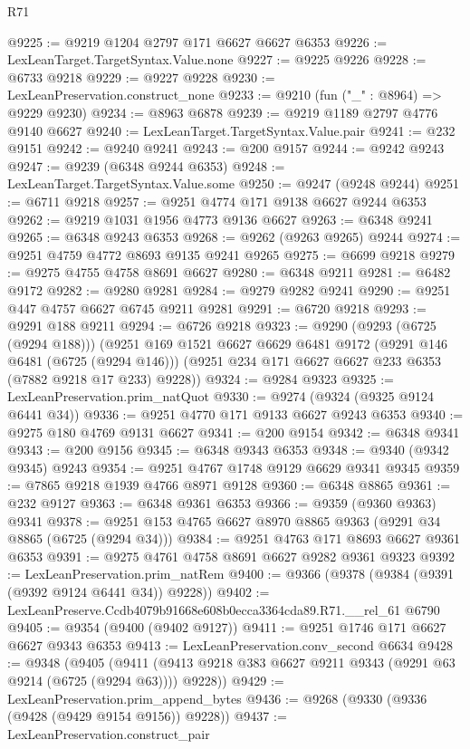 \begin{lexlean}{R71}
\begin{coremodule}
@9225 := @9219 @1204 @2797 @171 @6627 @6627 @6353
@9226 := LexLeanTarget.TargetSyntax.Value.none
@9227 := @9225 @9226
@9228 := @6733 @9218
@9229 := @9227 @9228
@9230 := LexLeanPreservation.construct_none
@9233 := @9210 (fun ("_" : @8964) => @9229 @9230)
@9234 := @8963 @6878
@9239 := @9219 @1189 @2797 @4776 @9140 @6627
@9240 := LexLeanTarget.TargetSyntax.Value.pair
@9241 := @232 @9151
@9242 := @9240 @9241
@9243 := @200 @9157
@9244 := @9242 @9243
@9247 := @9239 (@6348 @9244 @6353)
@9248 := LexLeanTarget.TargetSyntax.Value.some
@9250 := @9247 (@9248 @9244)
@9251 := @6711 @9218
@9257 := @9251 @4774 @171 @9138 @6627 @9244 @6353
@9262 := @9219 @1031 @1956 @4773 @9136 @6627
@9263 := @6348 @9241
@9265 := @6348 @9243 @6353
@9268 := @9262 (@9263 @9265) @9244
@9274 := @9251 @4759 @4772 @8693 @9135 @9241 @9265
@9275 := @6699 @9218
@9279 := @9275 @4755 @4758 @8691 @6627
@9280 := @6348 @9211
@9281 := @6482 @9172
@9282 := @9280 @9281
@9284 := @9279 @9282 @9241
@9290 := @9251 @447 @4757 @6627 @6745 @9211 @9281
@9291 := @6720 @9218
@9293 := @9291 @188 @9211
@9294 := @6726 @9218
@9323 := @9290
    (@9293 (@6725 (@9294 @188)))
    (@9251
      @169
      @1521
      @6627
      @6629
      @6481
      @9172
      (@9291 @146 @6481 (@6725 (@9294 @146)))
      (@9251 @234 @171 @6627 @6627 @233 @6353 (@7882 @9218 @17 @233) @9228))
@9324 := @9284 @9323
@9325 := LexLeanPreservation.prim_natQuot
@9330 := @9274 (@9324 (@9325 @9124 @6441 @34))
@9336 := @9251 @4770 @171 @9133 @6627 @9243 @6353
@9340 := @9275 @180 @4769 @9131 @6627
@9341 := @200 @9154
@9342 := @6348 @9341
@9343 := @200 @9156
@9345 := @6348 @9343 @6353
@9348 := @9340 (@9342 @9345) @9243
@9354 := @9251 @4767 @1748 @9129 @6629 @9341 @9345
@9359 := @7865 @9218 @1939 @4766 @8971 @9128
@9360 := @6348 @8865
@9361 := @232 @9127
@9363 := @6348 @9361 @6353
@9366 := @9359 (@9360 @9363) @9341
@9378 := @9251 @153 @4765 @6627 @8970 @8865 @9363 (@9291 @34 @8865 (@6725 (@9294 @34)))
@9384 := @9251 @4763 @171 @8693 @6627 @9361 @6353
@9391 := @9275 @4761 @4758 @8691 @6627 @9282 @9361 @9323
@9392 := LexLeanPreservation.prim_natRem
@9400 := @9366 (@9378 (@9384 (@9391 (@9392 @9124 @6441 @34)) @9228))
@9402 := LexLeanPreserve.Ccdb4079b91668e608b0ecca3364cda89.R71.__rel_61 @6790
@9405 := @9354 (@9400 (@9402 @9127))
@9411 := @9251 @1746 @171 @6627 @6627 @9343 @6353
@9413 := LexLeanPreservation.conv_second @6634
@9428 := @9348
    (@9405 (@9411 (@9413 @9218 @383 @6627 @9211 @9343 (@9291 @63 @9214 (@6725 (@9294 @63)))) @9228))
@9429 := LexLeanPreservation.prim_append_bytes
@9436 := @9268 (@9330 (@9336 (@9428 (@9429 @9154 @9156)) @9228))
@9437 := LexLeanPreservation.construct_pair

\end{coremodule}
\end{lexlean}
